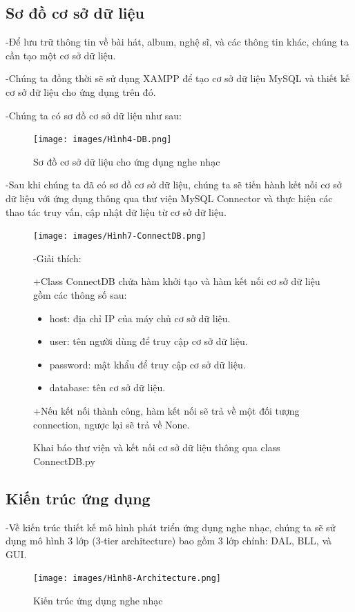 \documentclass[a4paper]{article}
\begin{document}
\subsection{Sơ đồ cơ sở dữ liệu}
\begin{flushleft}
	-Để lưu trữ thông tin về bài hát, album, nghệ sĩ, và các thông tin khác, chúng ta cần tạo một cơ sở dữ liệu.

	-Chúng ta đồng thời sẽ sử dụng XAMPP để tạo cơ sở dữ liệu MySQL và thiết kế cơ sở dữ liệu cho ứng dụng trên đó.

	-Chúng ta có sơ đồ cơ sở dữ liệu như sau:
	\begin{figure}[h]
		\begin{center}
			\texttt{[image: images/Hình4-DB.png]}
			\caption{Sơ đồ cơ sở dữ liệu cho ứng dụng nghe nhạc}
		\end{center}
	\end{figure}

	-Sau khi chúng ta đã có sơ đồ cơ sở dữ liệu, chúng ta sẽ tiến hành kết nối cơ sở dữ liệu với ứng dụng thông qua thư viện MySQL Connector
	và thực hiện các thao tác truy vấn, cập nhật dữ liệu từ cơ sở dữ liệu.

	\begin{figure}
		\centering
		\texttt{[image: images/Hình7-ConnectDB.png]}
		\caption{Khai báo thư viện và kết nối cơ sở dữ liệu thông qua class ConnectDB.py}
		\begin{flushleft}
			-Giải thích:

			+Class ConnectDB chứa hàm khởi tạo và hàm kết nối cơ sở dữ liệu gồm các thông số sau:
			\begin{itemize}
				\item host: địa chỉ IP của máy chủ cơ sở dữ liệu.
				\item user: tên người dùng để truy cập cơ sở dữ liệu.
				\item password: mật khẩu để truy cập cơ sở dữ liệu.
				\item database: tên cơ sở dữ liệu.
			\end{itemize}

			+Nếu kết nối thành công, hàm kết nối sẽ trả về một đối tượng connection, ngược lại sẽ trả về None.
		\end{flushleft}
	\end{figure}

\end{flushleft}
\clearpage
\newpage
\subsection{Kiến trúc ứng dụng}
\begin{flushleft}
	-Về kiến trúc thiết kế mô hình phát triển ứng dụng nghe nhạc, chúng ta sẽ sử dụng mô hình 3 lớp (3-tier architecture)
	bao gồm 3 lớp chính: DAL, BLL, và GUI.
	\begin{figure}[h]
		\centering
		\texttt{[image: images/Hình8-Architecture.png]}
		\caption{Kiến trúc ứng dụng nghe nhạc}
	\end{figure}
\end{flushleft}
\end{document}
